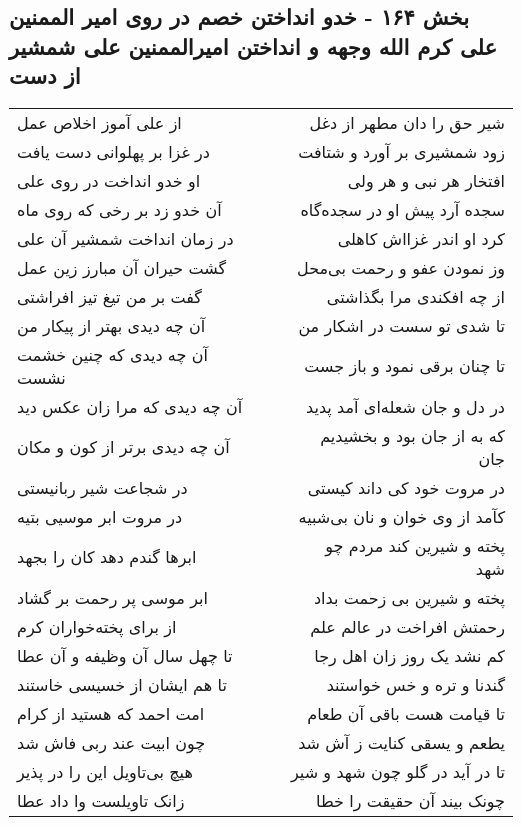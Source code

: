 \begin{center}
\section*{بخش ۱۶۴ - خدو انداختن خصم در روی امیر الممنین علی کرم الله وجهه و انداختن امیرالممنین علی شمشیر از دست}
\label{sec:sh164}
\begin{longtable}{l p{0.5cm} r}
از علی آموز اخلاص عمل
&&
شیر حق را دان مطهر از دغل
\\
در غزا بر پهلوانی دست یافت
&&
زود شمشیری بر آورد و شتافت
\\
او خدو انداخت در روی علی
&&
افتخار هر نبی و هر ولی
\\
آن خدو زد بر رخی که روی ماه
&&
سجده آرد پیش او در سجده‌گاه
\\
در زمان انداخت شمشیر آن علی
&&
کرد او اندر غزااش کاهلی
\\
گشت حیران آن مبارز زین عمل
&&
وز نمودن عفو و رحمت بی‌محل
\\
گفت بر من تیغ تیز افراشتی
&&
از چه افکندی مرا بگذاشتی
\\
آن چه دیدی بهتر از پیکار من
&&
تا شدی تو سست در اشکار من
\\
آن چه دیدی که چنین خشمت نشست
&&
تا چنان برقی نمود و باز جست
\\
آن چه دیدی که مرا زان عکس دید
&&
در دل و جان شعله‌ای آمد پدید
\\
آن چه دیدی برتر از کون و مکان
&&
که به از جان بود و بخشیدیم جان
\\
در شجاعت شیر ربانیستی
&&
در مروت خود کی داند کیستی
\\
در مروت ابر موسیی بتیه
&&
کآمد از وی خوان و نان بی‌شبیه
\\
ابرها گندم دهد کان را بجهد
&&
پخته و شیرین کند مردم چو شهد
\\
ابر موسی پر رحمت بر گشاد
&&
پخته و شیرین بی زحمت بداد
\\
از برای پخته‌خواران کرم
&&
رحمتش افراخت در عالم علم
\\
تا چهل سال آن وظیفه و آن عطا
&&
کم نشد یک روز زان اهل رجا
\\
تا هم ایشان از خسیسی خاستند
&&
گندنا و تره و خس خواستند
\\
امت احمد که هستید از کرام
&&
تا قیامت هست باقی آن طعام
\\
چون ابیت عند ربی فاش شد
&&
یطعم و یسقی کنایت ز آش شد
\\
هیچ بی‌تاویل این را در پذیر
&&
تا در آید در گلو چون شهد و شیر
\\
زانک تاویلست وا داد عطا
&&
چونک بیند آن حقیقت را خطا

\end{longtable}
\end{center}
